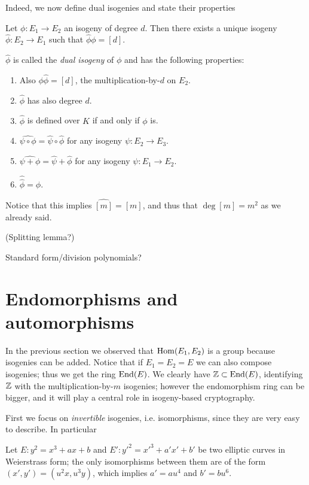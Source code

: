 Indeed, we now define dual isogenies and state their properties

\begin{theorem}
    Let $\phi:E_1\to E_2$ an isogeny of degree $d$. Then there exists a unique isogeny $\hat\phi:E_2\to E_1$ such that $\hat\phi \phi=[d]$.
    
    $\hat\phi$ is called the \emph{dual isogeny} of $\phi$ and has the following properties:
    \begin{enumerate}
        \item Also $\phi\hat\phi=[d]$, the multiplication-by-$d$ on $E_2$.
        \item $\hat\phi$ has also degree $d$.
        \item $\hat\phi$ is defined over $K$ if and only if $\phi$ is.
        \item $\widehat{\psi\circ\phi}=\hat\psi\circ\hat\phi$ for any isogeny $\psi:E_2\to E_3$.
        \item $\widehat{\psi + \phi}=\hat\psi + \hat\phi$ for any isogeny $\psi:E_1\to E_2$.
        \item $\hat{\hat\phi}=\phi$.
    \end{enumerate}
\end{theorem}

Notice that this implies $\widehat{[m]}=[m]$, and thus that $\deg[m]=m^2$ as we already said.

(Splitting lemma?)

Standard form/division polynomials?

\section{Endomorphisms and automorphisms}

In the previous section we observed that $\operatorname{Hom}(E_1, E_2)$ is a group because isogenies can be added. Notice that if $E_1=E_2=E$ we can also compose isogenies; thus we get the ring $\operatorname{End}(E)$. We clearly have $\mathbb{Z}\subset\operatorname{End}(E)$, identifying $\mathbb{Z}$ with the multiplication-by-$m$ isogenies; however the endomorphism ring can be bigger, and it will play a central role in isogeny-based cryptography.

First we focus on \emph{invertible} isogenies, i.e. isomorphisms, since they are very easy to describe. In particular
\begin{proposition}
    Let $E:y^2=x^3+ax+b$ and $E':{y'}^2={x'}^3+a'x'+b'$ be two elliptic curves in Weierstrass form; the only isomorphisms between them are of the form $(x',y')=(u^2x, u^3y)$, which implies $a'=au^4$ and $b'=bu^6$.
\end{proposition}

